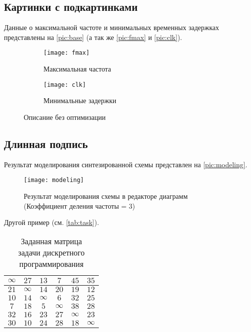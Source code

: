 \subsection{Картинки с подкартинками}

Данные о максимальной частоте и минимальных временных задержках представлены на \vref{pic:base} (а так же \vref{pic:fmax} и \vref{pic:clk}).\cite{subcap}

\begin{figure}[H]
	\begin{subfigure}{.4\linewidth}\centering
		\texttt{[image: fmax]}
		\caption{Максимальная частота}
		\label{pic:fmax}
	\end{subfigure}
	\begin{subfigure}{.6\linewidth}\centering
		\texttt{[image: clk]}
		\caption{Минимальные задержки}
		\label{pic:clk}
	\end{subfigure}
\caption{Описание без оптимизации}
\label{pic:base}
\end{figure}

\subsection{Длинная подпись}

Результат моделирования синтезированной схемы представлен на \vref{pic:modeling}. 

\begin{figure}[H]
\centering
\captionsetup{justification=centering} %
\texttt{[image: modeling]}
\caption{Результат моделирования схемы в редакторе диаграмм \\ (Коэффициент деления частоты = 3)}
\label{pic:modeling}
\end{figure}

Другой пример (см. \vref{tab:task}).

\begin{table}[H]
	\centering
	\captionsetup{justification=raggedleft}
	\caption{Заданная матрица \\ задачи дискретного программирования}
	\begin{tabular}{|c|c|c|c|c|c|}
		\hline $\infty$& $27$ & $13$ & $7$ & $45$ & $35$ \\
		\hline $21$ & $\infty$ & $14$ & $20$ & $19$ & $12$ \\
		\hline $10$ & $14$ & $\infty$ & $6$ & $32$ & $25$ \\
		\hline $7$ & $18$ & $5$ & $\infty$ & $38$ & $28$ \\
		\hline $32$ & $16$ & $23$ & $27$ & $\infty$ & $23$ \\
		\hline $30$ & $10$ & $24$ & $28$ & $18$ & $\infty$ \\
		\hline		
	\end{tabular}
	\label{tab:task}
\end{table}


